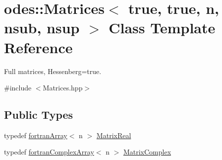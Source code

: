 \hypertarget{classodes_1_1Matrices_3_01true_00_01true_00_01n_00_01nsub_00_01nsup_01_4}{}\section{odes\+:\+:Matrices$<$ true, true, n, nsub, nsup $>$ Class Template Reference}
\label{classodes_1_1Matrices_3_01true_00_01true_00_01n_00_01nsub_00_01nsup_01_4}


Full matrices, Hessenberg=true.  




{\ttfamily \#include $<$Matrices.\+hpp$>$}

\subsection*{Public Types}
\begin{DoxyCompactItemize}
\item 
typedef \hyperlink{classodes_1_1fortranArray}{fortran\+Array}$<$ n $>$ \hyperlink{classodes_1_1Matrices_3_01true_00_01true_00_01n_00_01nsub_00_01nsup_01_4_a9c13d85a737f0806d9cfff89d3d59c52}{Matrix\+Real}
\item 
typedef \hyperlink{classodes_1_1fortranComplexArray}{fortran\+Complex\+Array}$<$ n $>$ \hyperlink{classodes_1_1Matrices_3_01true_00_01true_00_01n_00_01nsub_00_01nsup_01_4_a2325063092d57345f62b8a0d38c0632b}{Matrix\+Complex}
\end{DoxyCompactItemize}
